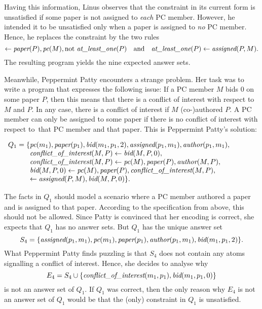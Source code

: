 \documentclass{tlp}
\newcommand{\naf}{\mathrm{not}}
\newcommand{\wrt}{with respect to}
\renewcommand{\mathit}[1]{{\text{\it{#1}}}}
\begin{document}
Having this information, Linus observes that the constraint in its current form is unsatisfied if  some paper is not assigned to \emph{each} PC member.
However, he intended it to be unsatisfied only when a paper is assigned to \emph{no} PC member.
Hence, he replaces the constraint
by the two rules 
$$\leftarrow \mathit{paper}(P), \mathit{pc}(M), \naf\ \mathit{at\_least\_one}(P)
\quad\mbox{and}\quad
\mathit{at\_least\_one}(P) \leftarrow \mathit{assigned}(P,M)\mbox{.}$$
The resulting program yields the nine expected answer sets.

Meanwhile, Peppermint Patty encounters a strange problem.
Her task was to  write a program that expresses the following issue:
If a PC member $M$ bids 0 on some paper $P$, then this means that there is  a conflict of interest \wrt\ $M$ and $P$.
In any case, there is a conflict of interest if  $M$ (co-)authored $P$. A PC member can only be assigned to some paper if
there is no conflict of interest \wrt\ that PC member and that paper.
This is Peppermint Patty's solution:
\begin{center}
$\begin{array}{r@{}l}
Q_{1} = \{ & \mathit{pc}(m_1),  \mathit{paper}(p_1), \mathit{bid}(m_1,p_1,2), \mathit{assigned}(p_1,m_1), \mathit{author}(p_1,m_1), \\&
\mathit{conflict\_of\_interest}(M,P) \leftarrow \mathit{bid}(M,P,0), \\&
\mathit{conflict\_of\_interest}(M,P)  \leftarrow \mathit{pc}(M), \mathit{paper}(P), \mathit{author}(M,P),\\&
\mathit{bid}(M,P,0) \leftarrow \mathit{pc}(M), \mathit{paper}(P), \mathit{conflict\_of\_interest}(M,P),\\&
\leftarrow \mathit{assigned}(P,M), \mathit{bid}(M,P,0) \}\mbox{.}
\end{array}$
\end{center}
The facts in $Q_{1}$ should model a scenario where a PC member authored a paper and is assigned to that paper. 
According to the specification from above, this should not  be  allowed. Since Patty is convinced that her encoding is 
correct, she expects that $Q_{1}$ has no answer sets. But $Q_{1}$ has
the unique answer set 
$$S_{4}=\{\mathit{assigned}(p_1,m_1),\mathit{pc}(m_1),
\mathit{paper}(p_1),
\mathit{author}(p_1,m_1),\mathit{bid}(m_1,p_1,2) \}\mbox{.}$$
What Peppermint Patty finds puzzling is that $S_{4}$ does not contain any atoms signalling a conflict of interest.
Hence, she decides to analyse why 
$$E_{4} = S_{4} \cup \{\mathit{conflict\_of\_interest}(m_1,p_1),\mathit{bid}(m_1,p_1,0)\}$$
is not an answer set of $Q_1$. 
If $Q_{1}$ was correct, then the only reason why $E_{4}$ is not an answer set of $Q_{1}$ would be
that the (only) constraint in $Q_{1}$ is unsatisfied. 
\end{document}
